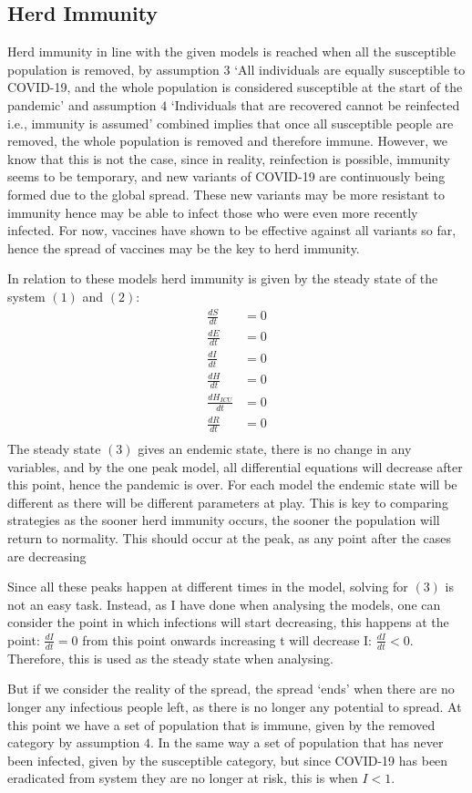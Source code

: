 \documentclass[11pt]{article}
\begin{document}
\subsection{Herd Immunity}
Herd immunity in line with the given models is reached when all the susceptible population is removed, by assumption $3$ ‘All individuals are equally susceptible to COVID-19, and the whole population is considered susceptible at the start of the pandemic’ and assumption $4$ ‘Individuals that are recovered cannot be reinfected i.e., immunity is assumed’ combined implies that once all susceptible people are removed, the whole population is removed and therefore immune. However, we know that this is not the case, since in reality, reinfection is possible, immunity seems to be temporary, and new variants of COVID-19 are continuously being formed due to the global spread. These new variants may be more resistant to immunity hence may be able to infect those who were even more recently infected. For now, vaccines have shown to be effective against all variants so far, hence the spread of vaccines may be the key to herd immunity. \par
In relation to these models herd immunity is given by the steady state of the system $(1)$ and $(2)$:
\begin{equation}
\begin{aligned}
\frac{dS}{dt}&=0\\
\frac{dE}{dt}&= 0 \\
\frac{dI}{dt}&= 0 \\
\frac{dH}{dt}&= 0\\
\frac{dH_{ICU}}{dt}&= 0 \\
\frac{dR}{dt}&=0 \\
\end{aligned}
\end{equation}
The steady state $(3)$ gives an endemic state, there is no change in any variables, and by the one peak model, all differential equations will decrease after this point, hence the pandemic is over. For each model the endemic state will be different as there will be different parameters at play. This is key to comparing strategies as the sooner herd immunity occurs, the sooner the population will return to normality. This should occur at the peak, as any point after the cases are decreasing \par
Since all these peaks happen at different times in the model, solving for $(3)$ is not an easy task. Instead, as I have done when analysing the models, one can consider the point in which infections will start decreasing, this happens at the point: $\frac{dI}{dt}=0$ from this point onwards increasing t will decrease I: $\frac{dI}{dt}<0$. Therefore, this is used as the steady state when analysing. \par
But if we consider the reality of the spread, the spread ‘ends’ when there are no longer any infectious people left, as there is no longer any potential to spread. At this point we have a set of population that is immune, given by the removed category by assumption $4$. In the same way a set of population that has never been infected, given by the susceptible category, but since COVID-19 has been eradicated from system they are no longer at risk, this is when $I<1$.
\end{document}
